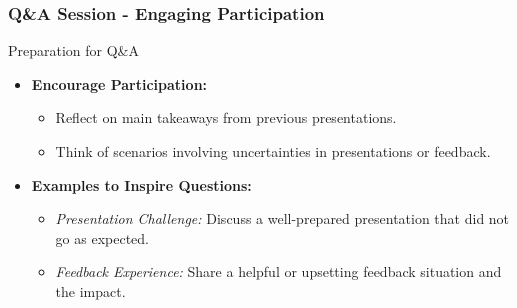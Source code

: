 \documentclass[aspectratio=169]{beamer}
\begin{document}
\begin{frame}[fragile]
    \frametitle{Q\&A Session - Engaging Participation}
    \begin{block}{Preparation for Q\&A}
        \begin{itemize}
            \item \textbf{Encourage Participation:}
                \begin{itemize}
                    \item Reflect on main takeaways from previous presentations.
                    \item Think of scenarios involving uncertainties in presentations or feedback.
                \end{itemize}
            \item \textbf{Examples to Inspire Questions:}
                \begin{itemize}
                    \item \textit{Presentation Challenge:} Discuss a well-prepared presentation that did not go as expected.
                    \item \textit{Feedback Experience:} Share a helpful or upsetting feedback situation and the impact.
                \end{itemize}
        \end{itemize}
    \end{block}
\end{frame}
\end{document}
